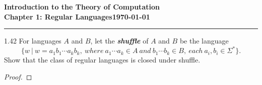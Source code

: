 \documentclass[11pt]{article}
\newcommand{\dated}{\today}
\begin{document}
\textbf{Introduction to the Theory of
Computation}\hfill\textbf{\myname}\\[0.01in]
\textbf{Chapter 1: Regular Languages}\hfill\textbf{\dated}\\
\smallskip\hrule\bigskip

\begin{problem}{1.42}
For languages $A$ and $B$, let the \textit{\textbf{shuffle}} of $A$ and $B$ be the language
\[
\{w \ | \ w = a_{1}b_{1} \cdots a_{k}b_{k}, \ where \ a_{1} \cdots a_{k} \in A \ and \ b_{1} \cdots b_{k} \in B, \ each \ a_{i}, b_{i} \in \Sigma^*\}.
\]
Show that the class of regular languages is closed under shuffle.
\end{problem}

\begin{proof}
\end{proof}
\end{document}
